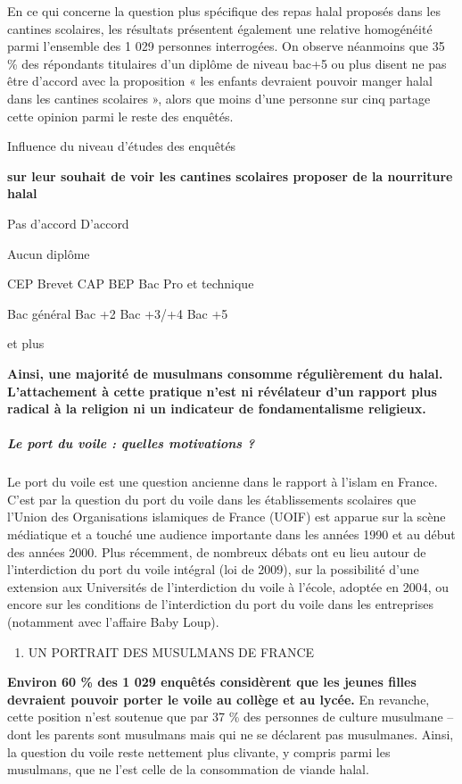 En ce qui concerne la question plus spécifique des repas halal proposés
dans les cantines scolaires, les résultats présentent également une
relative homogénéité parmi l'ensemble des 1 029 personnes interrogées.
On observe néanmoins que 35 \% des répondants titulaires d'un diplôme de
niveau bac+5 ou plus disent ne pas être d'accord avec la proposition «
les enfants devraient pouvoir manger halal dans les cantines scolaires
», alors que moins d'une personne sur cinq partage cette opinion parmi
le reste des enquêtés.


Influence du niveau d'études des enquêtés


\textbf{sur leur souhait de voir les cantines scolaires proposer de la
nourriture halal}

Pas d'accord D'accord

Aucun diplôme

CEP Brevet CAP BEP Bac Pro et technique


Bac général Bac +2 Bac +3/+4 Bac +5

et plus


\textbf{Ainsi, une majorité de musulmans consomme régulièrement du
halal. L'attachement à cette pratique n'est ni révélateur d'un rapport
plus radical à la religion ni un indicateur de fondamentalisme
religieux.}


\hypertarget{le-port-du-voile-quelles-motivations}{%
\subparagraph{Le port du voile : quelles motivations
?}\label{le-port-du-voile-quelles-motivations}}


Le port du voile est une question ancienne dans le rapport à l'islam en
France. C'est par la question du port du voile dans les établissements
scolaires que l'Union des Organisations islamiques de France (UOIF) est
apparue sur la scène médiatique et a touché une audience importante dans
les années 1990 et au début des années 2000. Plus récemment, de nombreux
débats ont eu lieu autour de l'interdiction du port du voile intégral
(loi de 2009), sur la possibilité d'une extension aux Universités de
l'interdiction du voile à l'école, adoptée en 2004, ou encore sur les
conditions de l'interdiction du port du voile dans les entreprises
(notamment avec l'affaire Baby Loup).


\begin{enumerate}
\def\labelenumi{\Roman{enumi}.}
\item
  UN PORTRAIT DES MUSULMANS DE FRANCE
\end{enumerate}


\textbf{Environ 60 \% des 1 029 enquêtés considèrent que les jeunes
filles devraient pouvoir porter le voile au collège et au lycée.} En
revanche, cette position n'est soutenue que par 37 \% des personnes de
culture musulmane -- dont les parents sont musulmans mais qui ne se
déclarent pas musulmanes. Ainsi, la question du voile reste nettement
plus clivante, y compris parmi les musulmans, que ne l'est celle de la
consommation de viande halal.

